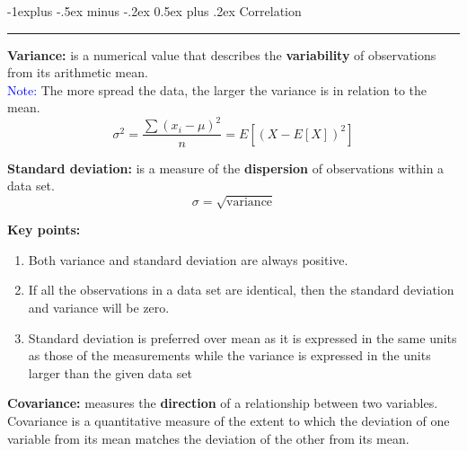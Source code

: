 \documentclass[letterpaper, 10.5pt,landscape]{article}
\makeatletter
\renewcommand{\subsection}{\@startsection{subsection}{2}{0mm}%
                                {-1explus -.5ex minus -.2ex}%
                                {0.5ex plus .2ex}%
                                {\normalfont\normalsize\bfseries}}
\makeatother
\begin{document}
\begin{multicols*}{3}
\vspace{5pt}


\subsection{Correlation} {\color{teal}\hrule height 0.5pt} \smallskip

\textbf{Variance: } is a numerical value that describes the \textbf{variability} of observations from its arithmetic mean. \\
\textcolor{blue}{Note:} The more spread the data, the larger the variance is in relation to the mean.
\vspace{-5pt}
\[\boxed{\sigma^{2} = \frac{\sum(x_{i} - \mu)^{2}}{n} = E\left[ \left(X - E[X] \right)^{2} \right]} \]


\textbf{Standard deviation: } is a measure of the \textbf{dispersion} of observations within a data set.
\vspace{-3pt}
\[\boxed{\sigma = \sqrt{\text{variance}}} \]

\textbf{Key points: }

\begin{enumerate}
    \vspace{-3pt}
    \item Both variance and standard deviation are always positive.
    \vspace{-3pt}
    \item If all the observations in a data set are identical, then the standard deviation and variance will be zero.
    \vspace{-3pt} 
    \item Standard deviation is preferred over mean as it is expressed in the same units as those of the measurements while the variance is expressed in the units larger than the given data set
\end{enumerate}


\textbf{Covariance: } measures the \textbf{direction} of a relationship between two variables.\\
Covariance is a quantitative measure of the extent to which the deviation of one variable from its mean matches the deviation of the other from its mean.  \\


\end{multicols*}
\end{document}
